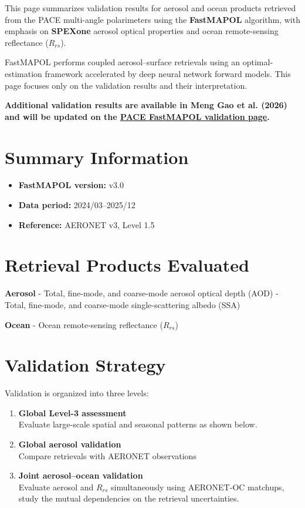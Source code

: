 \documentclass[
  letterpaper,
  open=any]{scrbook}
\providecommand{\tightlist}{%
  \setlength{\itemsep}{0pt}\setlength{\parskip}{0pt}}
\begin{document}
This page summarizes validation results for aerosol and ocean products
retrieved from the PACE multi-angle polarimeters using the
\textbf{FastMAPOL} algorithm, with emphasis on \textbf{SPEXone} aerosol
optical properties and ocean remote-sensing reflectance (\(R_{rs}\)).

FastMAPOL performs coupled aerosol--surface retrievals using an
optimal-estimation framework accelerated by deep neural network forward
models. This page focuses only on the validation results and their
interpretation.

\textbf{Additional validation results are available in Meng Gao et al.
(2026) and will be updated on the
\href{https://pace.oceansciences.org/pace_fastmapol.htm}{PACE FastMAPOL
validation page}.}

\section{Summary Information}\label{summary-information}

\begin{itemize}
\tightlist
\item
  \textbf{FastMAPOL version:} v3.0\\
\item
  \textbf{Data period:} 2024/03--2025/12\\
\item
  \textbf{Reference:} AERONET v3, Level 1.5
\end{itemize}

\section{Retrieval Products
Evaluated}\label{retrieval-products-evaluated}

\textbf{Aerosol} - Total, fine-mode, and coarse-mode aerosol optical
depth (AOD) - Total, fine-mode, and coarse-mode single-scattering albedo
(SSA)

\textbf{Ocean} - Ocean remote-sensing reflectance (\(R_{rs}\))

\section{Validation Strategy}\label{validation-strategy}

Validation is organized into three levels:

\begin{enumerate}
\def\labelenumi{\arabic{enumi}.}
\item
  \textbf{Global Level-3 assessment}\\
  Evaluate large-scale spatial and seasonal patterns as shown below.
\item
  \textbf{Global aerosol validation}\\
  Compare retrievals with AERONET observations
\item
  \textbf{Joint aerosol--ocean validation}\\
  Evaluate aerosol and \(R_{rs}\) simultaneously using AERONET-OC
  matchups, study the mutual dependencies on the retrieval
  uncertainties.
\end{enumerate}
\end{document}
